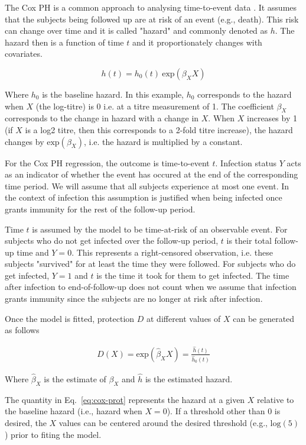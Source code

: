 The Cox PH is a common approach to analysing time-to-event data \cite{George;2014}. It assumes that the subjects being followed up are at risk of an event (e.g., death). This risk can change over time and it is called "hazard" and commonly denoted as $h$. The hazard then is a function of time $t$ and it proportionately changes with covariates.

$$
    h(t) = h_0(t) \ \text{exp}(\beta_XX)
$$

Where $h_0$ is the baseline hazard. In this example, $h_0$ corresponds to the hazard when $X$ (the log-titre) is 0 i.e. at a titre measurement of 1. The coefficient $\beta_X$ corresponds to the change in hazard with a change in $X$. When $X$ increases by 1 (if $X$ is a log2 titre, then this corresponds to a 2-fold titre increase), the hazard changes by $\text{exp}(\beta_X)$, i.e. the hazard is multiplied by a constant.

For the Cox PH regression, the outcome is time-to-event $t$. Infection status $Y$ acts as an indicator of whether the event has occured at the end of the corresponding time period. We will assume that all subjects experience at most one event. In the context of infection this assumption is justified when being infected once grants immunity for the rest of the follow-up period.

Time $t$ is assumed by the model to be time-at-risk of an observable event. For subjects who do not get infected over the follow-up period, $t$ is their total follow-up time and $Y=0$. This represents a right-censored observation, i.e. these subjects "survived" for at least the time they were followed. For subjects who do get infected, $Y=1$ and $t$ is the time it took for them to get infected. The time after infection to end-of-follow-up does not count when we assume that infection grants immunity since the subjects are no longer at risk after infection.

Once the model is fitted, protection $D$ at different values of $X$ can be generated as follows

\begin{gather}
    D(X) = \text{exp}(\hat{\beta}_X X) = \frac{\hat{h}(t)}{\hat{h}_0(t)}
    \label{eq:cox-prot}
\end{gather}

Where $\hat{\beta}_X$ is the estimate of $\beta_X$ and $\hat{h}$ is the estimated hazard.

The quantity in Eq.~\ref{eq:cox-prot} represents the hazard at a given $X$ relative to the baseline hazard (i.e., hazard when $X=0$). If a threshold other than $0$ is desired, the $X$ values can be centered around the desired threshold (e.g., $\text{log}(5)$) prior to fiting the model.
